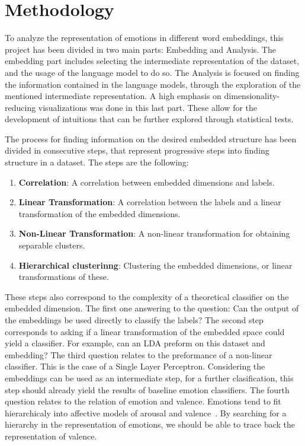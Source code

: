 \chapter{Methodology}\label{chap:Methodology}

To analyze the representation of emotions in different word embeddings, this project has been divided in two main parts: Embedding and Analysis. The embedding part includes selecting the intermediate representation of the dataset, and the usage of the language model to do so. The Analysis is focused on finding the information contained in the language models, through the exploration of the mentioned intermediate representation. A high emphasis on dimensionality-reducing visualizations was done in this last part. These allow for the development of intuitions that can be further explored through statistical tests.

The process for finding information on the desired embedded structure has been divided in consecutive steps, that represent progressive steps into finding structure in a dataset. The steps are the following:

\begin{enumerate}
  \item \textbf{Correlation}: A correlation between embedded dimensions and labels.
  \item \textbf{Linear Transformation}: A correlation between the labels and a linear transformation of the embedded dimensions.
  \item \textbf{Non-Linear Transformation}: A non-linear transformation for obtaining separable clusters.
  \item \textbf{Hierarchical clusterinng}: Clustering the embedded dimensions, or linear transformations of these.
\end{enumerate}

These steps also correspond to the complexity of a theoretical classifier on the embedded dimension. The first one answering to the question: Can the output of the embeddings be used directly to classify the labels? The second step corresponds to asking if a linear transformation of the embedded space could yield a classifier. For example, can an LDA preform on this dataset and embedding? The third question relates to the preformance of a non-linear classifier. This is the case of a Single Layer Perceptron. Considering the embeddings can be used as an intermediate step, for a further clasification, this step should already yield the results of baseline emotion classifiers. The fourth question relates to the relation of emotion and valence. Emotions tend to fit hierarchicaly into affective models of arousal and valence~\cite{barradas2016thesis}. By searching for a hierarchy in the representation of emotions, we should be able to trace back the representation of valence.

